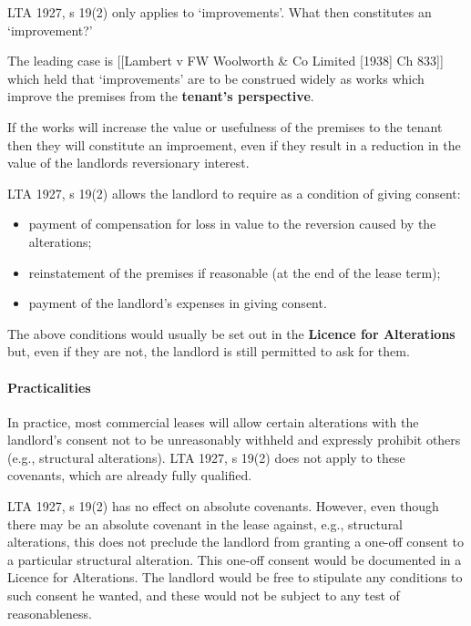 \documentclass[
]{article}
\newenvironment{Shaded}{}{}
\newcommand{\NormalTok}[1]{#1}
\providecommand{\tightlist}{%
  \setlength{\itemsep}{0pt}\setlength{\parskip}{0pt}}
\begin{document}
LTA 1927, s 19(2) only applies to `improvements'. What then constitutes
an `improvement?'

The leading case is {[}{[}Lambert v FW Woolworth \& Co Limited
{[}1938{]} Ch 833{]}{]} which held that `improvements' are to be
construed widely as works which improve the premises from the
\textbf{tenant's perspective}.

\begin{Shaded}
\begin{Highlighting}[]
\NormalTok{If the works will increase the value or usefulness of the premises to the tenant then they will constitute an improement, even if they result in a reduction in the value of the landlord\textquotesingle{}s reversionary interest. }
\end{Highlighting}
\end{Shaded}

LTA 1927, s 19(2) allows the landlord to require as a condition of
giving consent:

\begin{itemize}
\tightlist
\item
  payment of compensation for loss in value to the reversion caused by
  the alterations;
\item
  reinstatement of the premises if reasonable (at the end of the lease
  term);
\item
  payment of the landlord's expenses in giving consent.
\end{itemize}

The above conditions would usually be set out in the \textbf{Licence for
Alterations} but, even if they are not, the landlord is still permitted
to ask for them.

\hypertarget{practicalities}{%
\paragraph{Practicalities}\label{practicalities}}

In practice, most commercial leases will allow certain alterations with
the landlord's consent not to be unreasonably withheld and expressly
prohibit others (e.g., structural alterations). LTA 1927, s 19(2) does
not apply to these covenants, which are already fully qualified.

LTA 1927, s 19(2) has no effect on absolute covenants. However, even
though there may be an absolute covenant in the lease against, e.g.,
structural alterations, this does not preclude the landlord from
granting a one-off consent to a particular structural alteration. This
one-off consent would be documented in a Licence for Alterations. The
landlord would be free to stipulate any conditions to such consent he
wanted, and these would not be subject to any test of reasonableness.
\end{document}

